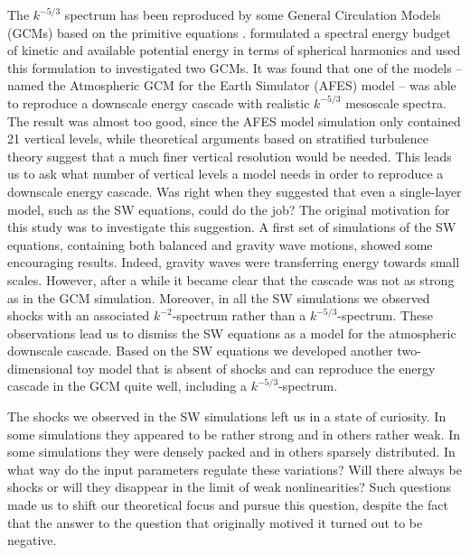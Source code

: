 The $ k^{-5/3} $ spectrum has been reproduced
 by some General Circulation Models (GCMs) based on the primitive
equations \citep[]{KoshykHamilton2001, Skamarock2004,
Hamilton_etal2008}.  \cite{AugierLindborg2013}  formulated a spectral energy
budget of kinetic and available potential energy in terms of spherical
harmonics and used this formulation to investigated two GCMs. It was found that
one of the models -- named the Atmospheric GCM for the Earth Simulator (AFES)
model -- was able to reproduce a downscale energy cascade with realistic $
k^{-5/3} $ mesoscale spectra. The result was almost too good, since the AFES
model simulation only contained 21 vertical levels, while theoretical arguments
based on stratified turbulence theory \citep[]{Lindborg2006} suggest that a much
finer vertical resolution would be needed. This leads us to ask what number of vertical levels a model needs in order  to reproduce a downscale energy cascade. Was \cite{YuanHamilton1994}  right  when they suggested that even a single-layer model, such as the SW equations, could do the job?
The original motivation for this study was to investigate this suggestion. A first set of
simulations of the SW equations, containing both balanced and gravity wave motions,
showed some encouraging results. Indeed, gravity waves were transferring energy towards
small scales. However, after a while it became clear that the cascade was not as strong
as in the GCM simulation.  Moreover, in all the SW simulations we observed shocks with
an associated $ k^{-2} $-spectrum rather than a $ k^{-5/3} $-spectrum. These
observations lead us to dismiss the SW equations as a model for the atmospheric
downscale cascade. Based on the SW equations we developed another two-dimensional toy
model  \citep[]{LindborgMohanan2017} that is absent of shocks and can reproduce the
energy cascade in the GCM quite well, including a $ k^{-5/3}  $-spectrum.

The shocks we observed in the SW simulations left us in a state of curiosity. In some simulations they appeared to be rather strong and in others rather weak. In some simulations they were densely packed and in others sparsely distributed.
In what way  do the input parameters regulate these variations? Will there
always be shocks or will they disappear in the limit of weak nonlinearities?
Such questions made us to shift our theoretical focus and pursue this question, despite the fact that the answer to the question that originally motived it turned out to be negative.

